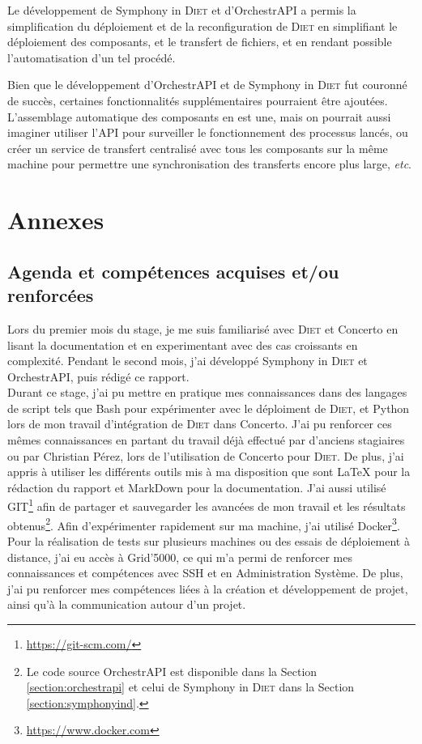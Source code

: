 \documentclass{article}
\newcommand{\etc}{\emph{etc}}
\newcommand{\api}{API\xspace}
\newcommand{\diet}{\textsc{Diet}\xspace} %
\newcommand{\concerto}{Concerto\xspace}
\newcommand{\gfivek}{Grid'5000\xspace}
\newcommand{\symphonyind}{Symphony in \diet} %
\newcommand{\orchestrapi}{OrchestrAPI\xspace}
\begin{document}
Le développement de \symphonyind et d'\orchestrapi a permis la simplification du
déploiement et de la reconfiguration de \diet en simplifiant le déploiement
des composants, et le transfert de fichiers, et en rendant possible
l'automatisation d'un tel procédé.\newline

Bien que le développement d'\orchestrapi et de \symphonyind fut couronné de
succès, certaines fonctionnalités supplémentaires pourraient être ajoutées.
L'assemblage automatique des composants en est une, mais on pourrait aussi
imaginer utiliser l'\api pour surveiller le fonctionnement des processus lancés,
ou créer un service de transfert centralisé avec tous les composants sur la même
machine pour permettre une synchronisation des transferts encore plus large,
\etc.


\section{Annexes}
\subsection{Agenda et compétences acquises et/ou renforcées}
Lors du premier mois du stage, je me suis familiarisé avec \diet et \concerto en
lisant la documentation et en experimentant avec des cas croissants en
complexité. Pendant le second mois, j'ai développé \symphonyind et \orchestrapi,
puis rédigé ce rapport.\\

Durant ce stage, j'ai pu mettre en pratique mes connaissances dans des langages
de script tels que Bash pour expérimenter avec le déploiment de \diet, et Python
lors de mon travail d'intégration de \diet dans \concerto. J'ai pu renforcer ces
mêmes connaissances en partant du travail déjà effectué par d'anciens stagiaires
ou par Christian Pérez, lors de l'utilisation de \concerto pour \diet. De plus,
j'ai appris à utiliser les différents outils mis à ma disposition que sont
\LaTeX\xspace pour la rédaction du rapport et MarkDown pour la documentation.
J'ai aussi utilisé GIT\footnote{\url{https://git-scm.com/}} afin de partager et
sauvegarder les avancées de mon travail et les résultats obtenus\footnote{Le
code source \orchestrapi est disponible dans la Section
\ref{section:orchestrapi} et celui de \symphonyind dans la Section
\ref{section:symphonyind}.}. Afin d'expérimenter rapidement sur ma machine, j'ai
utilisé Docker\footnote{\url{https://www.docker.com}}. Pour la réalisation de
tests sur plusieurs machines ou des essais de déploiement à distance, j'ai eu
accès à \gfivek, ce qui m'a permi de renforcer mes connaissances et compétences
avec SSH et en Administration Système. De plus, j'ai pu renforcer mes
compétences liées à la création et développement de projet, ainsi qu'à la
communication autour d'un projet.
\end{document}
